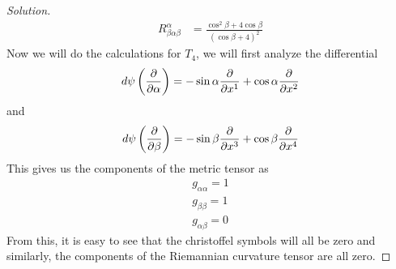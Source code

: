\documentclass[a4paper]{article}
\begin{document}
\begin{proof}[Solution]
\[\begin{aligned}
      R^\alpha_{\beta \alpha \beta} &= \frac{\cos^2 \beta + 4 \cos \beta}{(\cos \beta + 4)^2}
    \end{aligned}
  \]
  Now we will do the calculations for $T_4$, we will first analyze the differential
  \[
    d \psi \left( \pdv{\alpha} \right) = - \sin \alpha \pdv{x^1} + \cos \alpha \pdv{x^2}
  \]
  and
  \[
    d \psi \left( \pdv{\beta} \right) = -\sin \beta \pdv{x^3} + \cos \beta \pdv{x^4}
  \]
  This gives us the components of the metric tensor as
  \[
    \begin{aligned}
    g_{\alpha \alpha} = 1 \\
    g_{\beta \beta} = 1\\
    g_{\alpha \beta} = 0
    \end{aligned}
  \]
  From this, it is easy to see that the christoffel symbols will all be zero and similarly, the components of the Riemannian curvature tensor are all zero.
\end{proof}
\end{document}

